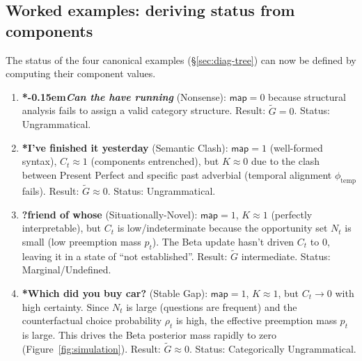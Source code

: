 \documentclass[12pt,letterpaper]{article}
\newcommand{\mention}[1]{\textit{#1}}
\newcommand{\judgesep}{\kern-0.15em}
\newcommand{\ungram}[1]{*\judgesep#1}
\begin{document}
\subsection{Worked examples: deriving status from components}
\label{sec:worked-examples}

The status of the four canonical examples (\S\ref{sec:diag-tree}) can now be defined by computing their component values.

\begin{enumerate}
   \item \textbf{\ungram{\mention{Can the have running}}} (Nonsense): 
   $\mathsf{map}=0$ because structural analysis fails to assign a valid category structure. 
   Result: $\widetilde{G} = 0$. Status: Ungrammatical.
   
   \item \textbf{*I've finished it yesterday} (Semantic Clash): 
   $\mathsf{map}=1$ (well-formed syntax), $C_t \approx 1$ (components entrenched), but $K \approx 0$ due to the clash between Present Perfect and specific past adverbial (temporal alignment $\phi_{\text{temp}}$ fails). 
   Result: $\widetilde{G} \approx 0$. Status: Ungrammatical.
   
   \item \textbf{?friend of whose} (Situationally-Novel): 
   $\mathsf{map}=1$, $K \approx 1$ (perfectly interpretable), but $C_t$ is low/indeterminate because the opportunity set $N_t$ is small (low preemption mass $p_t$). The Beta update hasn't driven $C_t$ to 0, leaving it in a state of \enquote{not established}. 
   Result: $\widetilde{G}$ intermediate. Status: Marginal/Undefined.
   
   \item \textbf{*Which did you buy car?} (Stable Gap): 
   $\mathsf{map}=1$, $K \approx 1$, but $C_t \to 0$ with high certainty. Since $N_t$ is large (questions are frequent) and the counterfactual choice probability $\rho_t$ is high, the effective preemption mass $p_t$ is large. This drives the Beta posterior mass rapidly to zero (Figure~\ref{fig:simulation}).
   Result: $\widetilde{G} \approx 0$. Status: Categorically Ungrammatical.
\end{enumerate}
\end{document}
